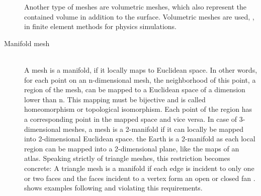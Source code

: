 \begin{description}
	Another type of meshes are volumetric meshes, which also represent the contained volume in addition to the surface.
	Volumetric meshes are used, \eg, in finite element methods for physics simulations.


	\item[Manifold mesh] \hfill \\
	A mesh is a manifold, if it locally maps to Euclidean space.
	In other words, for each point on an n-dimensional mesh, the neighborhood of this point, \ie a region of the mesh, can be mapped to a Euclidean space of a dimension lower than n.
	This mapping must be bijective and is called homeomorphism or topological isomorphism.
	Each point of the region has a corresponding point in the mapped space and vice versa.
	In case of 3-dimensional meshes, a mesh is a 2-manifold if it can locally be mapped into 2-dimensional Euclidean space.
	\Eg the Earth is a 2-manifold as each local region can be mapped into a 2-dimensional plane, like the maps of an atlas.
	Speaking strictly of triangle meshes, this restriction becomes concrete:
	A triangle mesh is a manifold if each edge is incident to only one or two faces and the faces incident to a vertex form an open or closed fan \cite{mesh_basics}.
	 shows examples following and violating this requirements.


\end{description}
